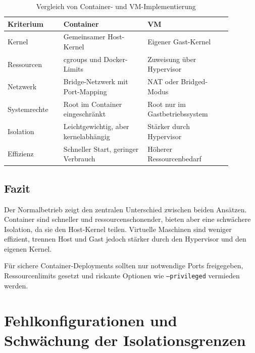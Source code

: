 \documentclass[conference]{IEEEtran}
\begin{document}
\begin{table}[H]
\centering
\caption{Vergleich von Container- und VM-Implementierung}
\label{tab:vergleich}
\footnotesize
\begin{tabular}{p{0.22\linewidth} p{0.33\linewidth} p{0.33\linewidth}}
\toprule
\textbf{Kriterium} & \textbf{Container} & \textbf{VM} \\
\midrule
Kernel &
Gemeinsamer Host-Kernel &
Eigener Gast-Kernel \\

Ressourcen &
cgroups und Docker-Limits &
Zuweisung über Hypervisor \\

Netzwerk &
Bridge-Netzwerk mit Port-Mapping &
NAT oder Bridged-Modus \\

Systemrechte &
Root im Container eingeschränkt &
Root nur im Gastbetriebssystem \\

Isolation &
Leichtgewichtig, aber kernelabhängig &
Stärker durch Hypervisor \\

Effizienz &
Schneller Start, geringer Verbrauch &
Höherer Ressourcenbedarf \\

\bottomrule
\end{tabular}
\end{table}

\subsection{Fazit}
Der Normalbetrieb zeigt den zentralen Unterschied zwischen beiden Ansätzen.
Container sind schneller und ressourcenschonender, bieten aber eine schwächere
Isolation, da sie den Host-Kernel teilen. Virtuelle Maschinen sind weniger
effizient, trennen Host und Gast jedoch stärker durch den Hypervisor und den
eigenen Kernel.

Für sichere Container-Deployments sollten nur notwendige Ports freigegeben,
Ressourcenlimits gesetzt und riskante Optionen wie \texttt{--privileged}
vermieden werden.

\section{Fehlkonfigurationen und Schwächung der Isolationsgrenzen}
\label{sec:fehlkonfig}
\end{document}
